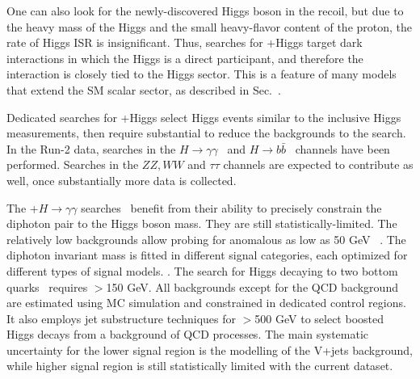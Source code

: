%


One can also look for the newly-discovered Higgs boson in the recoil, but due to the heavy mass of the Higgs and the small heavy-flavor content of the proton, the rate of Higgs ISR is insignificant. 
Thus, searches for \MET+Higgs target dark interactions in which the Higgs is a direct participant, and therefore the interaction is closely tied to the Higgs sector. 
This is a feature of many models that extend the SM scalar sector, as described in Sec.~\cite{sec:BSMMediatorModels}. 

Dedicated searches for \MET+Higgs select Higgs events similar to the inclusive Higgs measurements, then require substantial \MET to reduce the backgrounds to the search.
In the Run-2 data, searches in the $H \rightarrow \gamma\gamma$~\cite{CMS-PAS-EXO-16-054,Aaboud:2017uak} and $H \rightarrow b\bar{b}$~\cite{Aaboud:2017yqz} channels have been performed.
Searches in the $ZZ, WW$ and $\tau\tau$ channels are expected to contribute as well, once substantially more data is collected. 

The \MET+$H \rightarrow \gamma\gamma$ searches~\cite{CMS-PAS-EXO-16-054,Aaboud:2017uak} benefit from their ability to precisely constrain the diphoton pair to the Higgs boson mass.
They are still statistically-limited.
The relatively low backgrounds allow probing for anomalous \MET as low as 50 GeV~\cite{CMS-PAS-EXO-16-054} .
The diphoton invariant mass is fitted in different signal categories, each optimized for different types of signal models. . 
The search for Higgs decaying to two bottom quarks~\cite{Aaboud:2017yqz} requires \MET$>$150 GeV. All backgrounds except for the QCD background are estimated using MC simulation and constrained in dedicated control regions. 
It also employs jet substructure techniques for \MET$>$500 GeV to select boosted Higgs decays from a background of QCD processes.
The main systematic uncertainty for the lower \MET signal region is the modelling of the V+jets background, while higher \MET signal region is still statistically limited with the current dataset.

